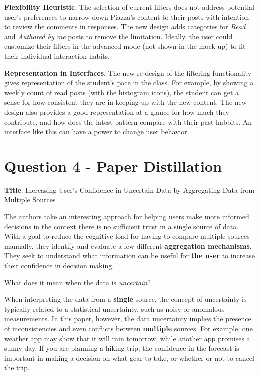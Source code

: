 \documentclass[12pt,letterpaper]{article}
\begin{document}
\textbf{Flexibility Heuristic}. The selection of current filters does not address potential user's preferences to narrow down Piazza's content to their posts with intention to review the comments in responses. The new design adds categories for \textit{Read} and \textit{Authored by me} posts to remove the limitation. Ideally, the user could customize their filters in the advanced mode (not shown in the mock-up) to fit their individual interaction habits. 

\textbf{Representation in Interfaces}. The new re-design of the filtering functionality gives representation of the student's pace in the class. For example, by showing a weekly count of read posts (with the histogram icons), the student can get a sense for how consistent they are in keeping up with the new content. The new design also provides a good representation at a glance for how much they contribute, and how does the latest pattern compare with their past habbits. An interface like this can have a power to change user behavior. 

\section*{Question 4 - Paper Distillation}

\textbf{Title}: Increasing User's Confidence in Uncertain Data by Aggregating Data from Multiple Sources \cite{greis2017increasing}

The authors take an interesting approach for helping users make more informed decisions in the context there is no sufficient trust in a single source of data. With a goal to reduce the cognitive load for having to compare multiple sources manually, they identify and evaluate a few different \textbf{aggregation mechanisms}. They seek to understand what information can be useful for \textbf{the user} to increase their confidence in decision making. 

What does it mean when the data is \textit{uncertain}? 

When interpreting the data from a \textbf{single} source, the concept of uncertainty is typically related to a statistical uncertainty, such as noisy or anomalous measurements. In this paper, however, the data uncertainty implies the presence of inconsistencies and even conflicts between \textbf{multiple} sources. For example, one weather app may show that it will rain tomorrow, while another app promises a sunny day. If you are planning a hiking trip, the confidence in the forecast is important in making a decision on what gear to take, or whether or not to cancel the trip.  
\end{document}
